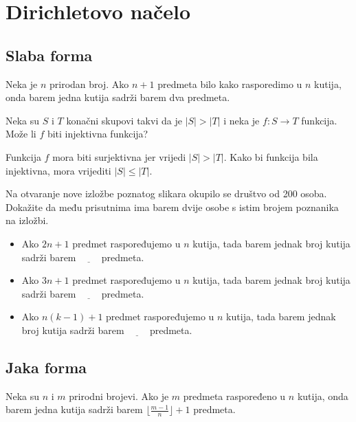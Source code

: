 \section{Dirichletovo načelo}

\subsection{Slaba forma}

\begin{theorem}
    Neka je $n$ prirodan broj. Ako $n+1$ predmeta bilo kako rasporedimo u $n$
    kutija, onda barem jedna kutija sadrži barem dva predmeta.
\end{theorem}

\begin{example}
    Neka su $S$ i $T$ konačni skupovi takvi da je $|S| > |T|$ i neka je $f:S\to
    T$ funkcija. Može li $f$ biti injektivna funkcija?
\end{example}

Funkcija $f$ mora biti surjektivna jer vrijedi $|S| > |T|$. Kako bi funkcija
bila injektivna, mora vrijediti $|S| \leq |T|$.

\begin{example}
    Na otvaranje nove izložbe poznatog slikara okupilo se društvo od 200 osoba.
    Dokažite da među prisutnima ima barem dvije osobe s istim brojem poznanika
    na izložbi.
\end{example}

\begin{example}
    \begin{itemize}
        \item Ako $2n+1$ predmet raspoređujemo u $n$ kutija, tada barem jednak
        broj kutija sadrži barem $\underline{\qquad}$ predmeta.
        \item Ako $3n+1$ predmet raspoređujemo u $n$ kutija, tada barem jednak
        broj kutija sadrži barem $\underline{\qquad}$ predmeta.
        \item Ako $n(k-1)+1$ predmet raspoređujemo u $n$ kutija, tada barem
        jednak broj kutija sadrži barem $\underline{\qquad}$ predmeta.
    \end{itemize}
\end{example}

\subsection{Jaka forma}

\begin{theorem}
    Neka su $n$ i $m$ prirodni brojevi. Ako je $m$ predmeta raspoređeno u $n$
    kutija, onda barem jedna kutija sadrži barem $\lfloor \frac{m-1}{n} \rfloor
    + 1$ predmeta.
\end{theorem}


